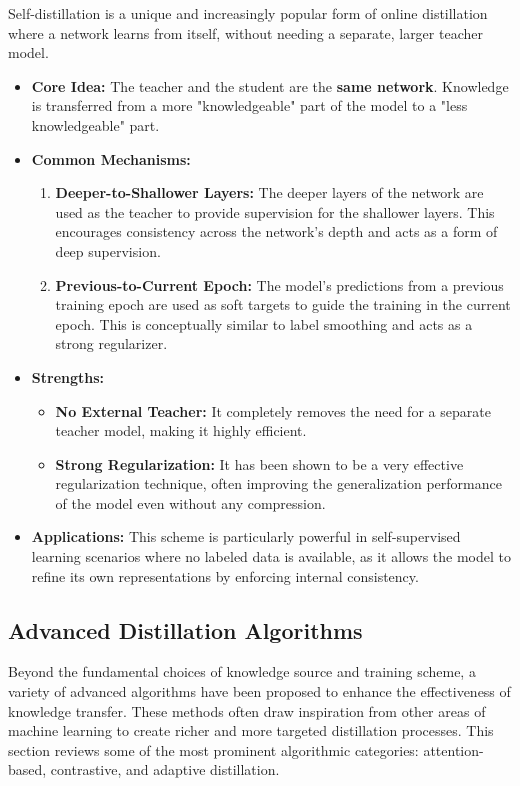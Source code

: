 Self-distillation is a unique and increasingly popular form of online distillation where a network learns from itself, without needing a separate, larger teacher model.

\begin{itemize}
    \item \textbf{Core Idea:} The teacher and the student are the \textbf{same network}. Knowledge is transferred from a more "knowledgeable" part of the model to a "less knowledgeable" part.
    \item \textbf{Common Mechanisms:}
        \begin{enumerate}
            \item \textbf{Deeper-to-Shallower Layers:} The deeper layers of the network are used as the teacher to provide supervision for the shallower layers. This encourages consistency across the network's depth and acts as a form of deep supervision.
            \item \textbf{Previous-to-Current Epoch:} The model's predictions from a previous training epoch are used as soft targets to guide the training in the current epoch. This is conceptually similar to label smoothing and acts as a strong regularizer.
        \end{enumerate}
    \item \textbf{Strengths:}
        \begin{itemize}
            \item \textbf{No External Teacher:} It completely removes the need for a separate teacher model, making it highly efficient.
            \item \textbf{Strong Regularization:} It has been shown to be a very effective regularization technique, often improving the generalization performance of the model even without any compression.
        \end{itemize}
    \item \textbf{Applications:} This scheme is particularly powerful in self-supervised learning scenarios where no labeled data is available, as it allows the model to refine its own representations by enforcing internal consistency.
\end{itemize}
\subsection{Advanced Distillation Algorithms}
\label{sec:kd_algorithms}

Beyond the fundamental choices of knowledge source and training scheme, a variety of advanced algorithms have been proposed to enhance the effectiveness of knowledge transfer. These methods often draw inspiration from other areas of machine learning to create richer and more targeted distillation processes. This section reviews some of the most prominent algorithmic categories: attention-based, contrastive, and adaptive distillation.

